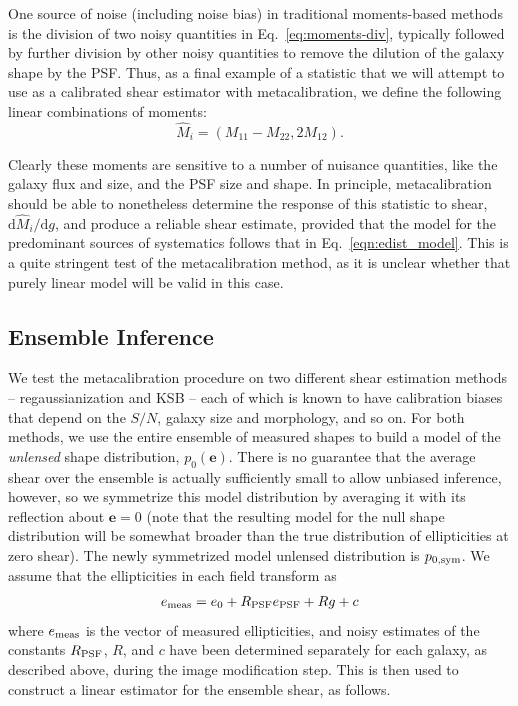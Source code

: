 \documentclass[iop]{emulateapj}
\begin{document}
One source of noise (including noise bias) in traditional moments-based methods is the
division of two noisy quantities in Eq.~\ref{eq:moments-div},
typically followed by further division by other noisy quantities to
remove the dilution of the galaxy shape by the PSF.  Thus, as a final
example of a statistic that we will attempt to use as a calibrated
shear estimator with metacalibration, we define the following linear
combinations of moments:
\begin{equation}
\hat{M}_i = (M_{11}-M_{22}, 2M_{12}).
\end{equation}

Clearly these moments are sensitive to a number of nuisance
quantities, like the galaxy flux and size, and the PSF size and shape.
In principle, metacalibration should be able to nonetheless determine
the response of this statistic to shear,
$\mathrm{d}\hat{M}_i/\mathrm{d}g$, and produce a reliable shear
estimate, provided that the model for the predominant sources of
systematics follows that in Eq.~\ref{eqn:edist_model}.  This is a
quite stringent test of the metacalibration method, as it is unclear
whether that purely linear model will be valid in this case.


\subsection{Ensemble Inference}
We test the metacalibration procedure on two different shear
estimation methods -- regaussianization and KSB -- each of which is
known to have calibration biases that depend on the $S/N$, galaxy size
and morphology, and so on. For both methods, we use the entire
ensemble of measured shapes to build a model of the {\it unlensed}
shape distribution, $p_0(\mathbf{e})$. There is no guarantee that the
average shear over the ensemble is actually sufficiently small to
allow unbiased inference, however, so we symmetrize this model
distribution by averaging it with its reflection about $\mathbf{e}=0$
(note that the resulting model for the null shape distribution will be
somewhat broader than the true distribution of ellipticities at zero
shear). The newly symmetrized model unlensed distribution is
$p_{0,\rm sym}$. We assume that the ellipticities in each field
transform as
\begin{align}
{e}_{\rm meas} = {e}_{0} + R_{\rm PSF}{e}_{\rm PSF} + R{g} + {c}
\label{eqn:edist_model}
\end{align}
where $e_{\rm meas}$ is the vector of measured ellipticities, and
noisy estimates of the constants $R_{\rm PSF}$, $R$, and $c$ have been
determined separately for each galaxy, as described above, during the
image modification step. This is then used to construct a linear
estimator for the ensemble shear, as follows.
\end{document}
